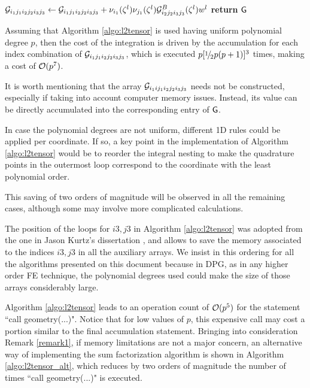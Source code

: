 \begin{algorithm}[ht]
\begin{algorithmic}
                    \EndFor
                \EndFor
            \EndFor
                            \State $\mathcal{G}_{i_1j_1i_2j_2i_3j_3}\gets \mathcal{G}_{i_1j_1i_2j_2i_3j_3}+ \nu_{i_1}(\zeta^l)\nu_{j_1}(\zeta^l)\mathcal{G}_{i_2j_2i_3j_3}^B(\zeta^l)w^l$ 
                        \EndFor
                    \EndFor
                \EndFor
            \EndFor
        \EndFor
    \EndFor
\EndFor
\State \textbf{return} $\mathsf{G}$
\EndProcedure
\end{algorithmic}
\end{algorithm}

Assuming that Algorithm \ref{algo:l2tensor} is used having uniform polynomial degree $p$, then the cost of the integration is driven by the accumulation for each index combination of $\mathcal{G}_{i_1j_1i_2j_2i_3j_3}$, which is executed $p[\onehalf p(p+1)]^3$ times, making a cost of $\mathcal{O}(p^7)$.

It is worth mentioning that the array $\mathcal{G}_{i_1ij_1i_2j_2i_3j_3}$ needs not be constructed, especially if taking into account computer memory issues. Instead, its value can be directly accumulated into the corresponding entry of $\mathsf{G}$.

In case the polynomial degrees are not uniform, different 1D rules could be applied per coordinate. If so, a key point in the implementation of Algorithm \ref{algo:l2tensor} would be to reorder the integral nesting to make the quadrature points in the outermost loop correspond to the coordinate with the least polynomial order.

This saving of two orders of magnitude will be observed in all the remaining cases, although some may involve more complicated calculations.

\begin{remark}
    The position of the loops for $i3,j3$ in Algorithm \ref{algo:l2tensor} was adopted from the one in Jason Kurtz's dissertation \cite{kurtz2007fully}, and allows to save the memory associated to the indices $i3,j3$ in all the auxiliary arrays. We insist in this ordering for all the algorithms presented on this document because in DPG, as in any higher order FE technique, the polynomial degrees used could make the size of those arrays considerably large.
\label{remark1}
\end{remark}

\begin{remark}
    Algorithm \ref{algo:l2tensor} leads to an operation count of $\mathcal{O}(p^5)$ for the statement ``call geometry(...)". Notice that for low values of $p$, this expensive call may cost a portion similar to the final accumulation statement. Bringing into consideration Remark \ref{remark1}, if memory limitations are not a major concern, an alternative way of implementing the sum factorization algorithm is shown in Algorithm \ref{algo:l2tensor_alt}, which reduces by two orders of magnitude the number of times ``call geometry(...)" is executed.
    \label{remark2}
\end{remark}

